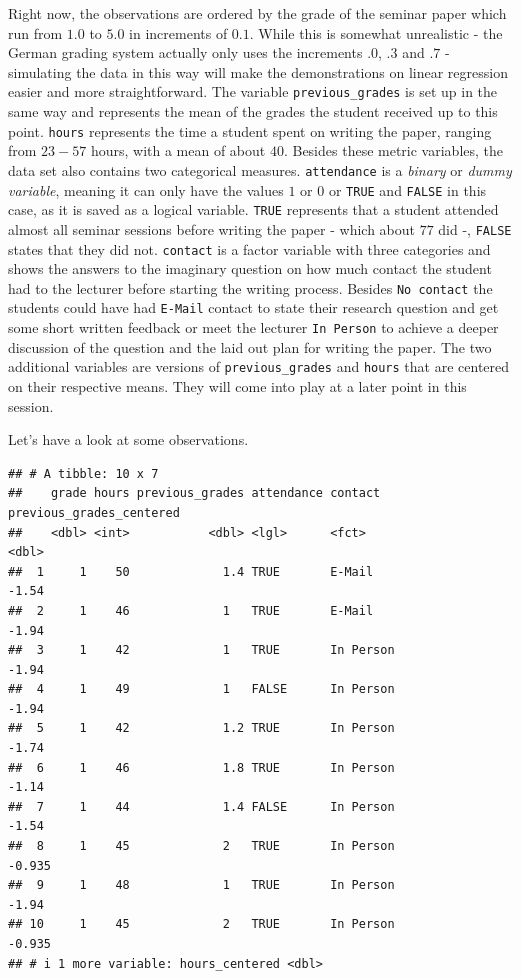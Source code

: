 \documentclass[
]{book}
\begin{document}
Right now, the observations are ordered by the grade of the seminar paper which
run from \(1.0\) to \(5.0\) in increments of \(0.1\). While this is somewhat
unrealistic - the German grading system actually only uses the increments \(.0\),
\(.3\) and \(.7\) - simulating the data in this way will make the demonstrations on
linear regression easier and more straightforward. The variable
\texttt{previous\_grades} is set up in the same way and represents the mean of the
grades the student received up to this point. \texttt{hours} represents the time a
student spent on writing the paper, ranging from \(23 - 57\) hours, with a mean of
about \(40\). Besides these metric variables, the data set also contains two
categorical measures. \texttt{attendance} is a \emph{binary} or \emph{dummy variable}, meaning it can only
have the values \(1\) or \(0\) or \texttt{TRUE} and \texttt{FALSE} in this case, as it is saved as
a logical variable. \texttt{TRUE} represents that a student attended almost all seminar
sessions before writing the paper - which about \(77%
\) did -, \texttt{FALSE} states that
they did not.
\texttt{contact} is a factor variable with three categories and shows the answers to
the imaginary question on how much contact the student had to the lecturer
before starting the writing process. Besides \texttt{No\ contact} the students could
have had \texttt{E-Mail} contact to state their research question and get some short
written feedback or meet the lecturer \texttt{In\ Person} to achieve a deeper discussion
of the question and the laid out plan for writing the paper.
The two additional variables are versions of \texttt{previous\_grades} and \texttt{hours} that
are centered on their respective means. They will come into play at a later
point in this session.

Let's have a look at some observations.

\begin{verbatim}
## # A tibble: 10 x 7
##    grade hours previous_grades attendance contact   previous_grades_centered
##    <dbl> <int>           <dbl> <lgl>      <fct>                        <dbl>
##  1     1    50             1.4 TRUE       E-Mail                      -1.54 
##  2     1    46             1   TRUE       E-Mail                      -1.94 
##  3     1    42             1   TRUE       In Person                   -1.94 
##  4     1    49             1   FALSE      In Person                   -1.94 
##  5     1    42             1.2 TRUE       In Person                   -1.74 
##  6     1    46             1.8 TRUE       In Person                   -1.14 
##  7     1    44             1.4 FALSE      In Person                   -1.54 
##  8     1    45             2   TRUE       In Person                   -0.935
##  9     1    48             1   TRUE       In Person                   -1.94 
## 10     1    45             2   TRUE       In Person                   -0.935
## # i 1 more variable: hours_centered <dbl>
\end{verbatim}
\end{document}
